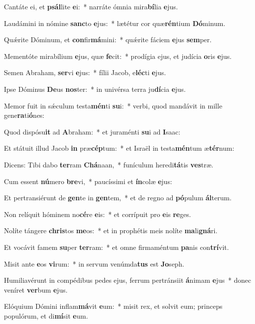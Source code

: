 \item Cantáte ei, et \textbf{psál}lite \textbf{e}i:~* narráte ómnia mira\textbf{bí}lia \textbf{e}jus.
\item Laudámini in nómine \textbf{sanc}to \textbf{e}jus:~* lætétur cor quæ\textbf{rén}tium \textbf{Dó}minum.
\item Quǽrite Dóminum, et \textbf{con}fir\textbf{má}mini:~* quǽrite fáciem \textbf{e}jus \textbf{sem}per.
\item Mementóte mirabílium \textbf{e}jus, quæ \textbf{fe}cit:~* prodígia ejus, et judícia \textbf{o}ris \textbf{e}jus.
\item Semen Abraham, \textbf{ser}vi \textbf{e}jus:~* fílii Jacob, e\textbf{léc}ti \textbf{e}jus.
\item Ipse Dóminus \textbf{De}us \textbf{nos}ter:~* in univérsa terra ju\textbf{dí}cia \textbf{e}jus.
\item Memor fuit in sǽculum testa\textbf{mén}ti \textbf{su}i:~* verbi, quod mandávit in mille gene\textbf{ra}ti\textbf{ó}nes:
\item Quod dispósu\textbf{it} ad \textbf{A}braham:~* et juraménti \textbf{su}i ad \textbf{I}saac:
\item Et státuit illud Jacob \textbf{in} præ\textbf{cép}tum:~* et Israël in testa\textbf{mén}tum æ\textbf{tér}num:
\item Dicens: Tibi dabo \textbf{ter}ram \textbf{Chá}naan,~* funículum heredi\textbf{tá}tis \textbf{ves}træ.
\item Cum essent \textbf{nú}mero \textbf{bre}vi,~* paucíssimi et \textbf{ín}colæ \textbf{e}jus:
\item Et pertransiérunt de \textbf{gen}te in \textbf{gen}tem,~* et de regno ad \textbf{pó}pulum \textbf{ál}terum.
\item Non relíquit hóminem no\textbf{cé}re \textbf{e}is:~* et corrípuit pro \textbf{e}is \textbf{re}ges.
\item Nolíte tángere \textbf{chris}tos \textbf{me}os:~* et in prophétis meis nolíte \textbf{ma}li\textbf{gná}ri.
\item Et vocávit famem \textbf{su}per \textbf{ter}ram:~* et omne firmaméntum \textbf{pa}nis con\textbf{trí}vit.
\item Misit ante \textbf{e}os \textbf{vi}rum:~* in servum venúmda\textbf{tus} est \textbf{Jo}seph.
\item Humiliavérunt in compédibus pedes ejus, ferrum pertránsiit \textbf{á}nimam \textbf{e}jus~* donec veníret \textbf{ver}bum \textbf{e}jus.
\item Elóquium Dómini inflam\textbf{má}vit \textbf{e}um:~* misit rex, et solvit eum; princeps populórum, et di\textbf{mí}sit \textbf{e}um.
